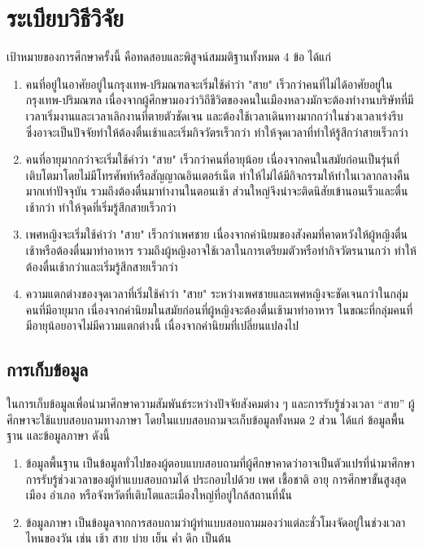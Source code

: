 \documentclass[a4paper]{article}
\begin{document}
\section{ระเบียบวิธีวิจัย}
    เป้าหมายของการศึกษาครั้งนี้ คือทดสอบและพิสูจน์สมมติฐานทั้งหมด 4 ข้อ ได้แก่
    \begin{enumerate}
        \item คนที่อยู่ในอาศัยอยู่ในกรุงเทพ-ปริมณฑลจะเริ่มใช้คำว่า "สาย" เร็วกว่าคนที่ไม่ได้อาศัยอยู่ในกรุงเทพ-ปริมณฑล เนื่องจากผู้ศึกษามองว่าวิถีชีวิตของคนในเมืองหลวงมักจะต้องทำงานบริษัทที่มีเวลาเริ่มงานและเวลาเลิกงานที่ตายตัวชัดเจน และต้องใช้เวลาเดินทางมากกว่าในช่วงเวลาเร่งรีบ ซึ่งอาจะเป็นปัจจัยทำให้ต้องตื่นเช้าและเริ่มกิจวัตรเร็วกว่า ทำให้จุดเวลาที่ทำให้รู้สึกว่าสายเร็วกว่า
        \item คนที่อายุมากกว่าจะเริ่มใช้คำว่า "สาย" เร็วกว่าคนที่อายุน้อย เนื่องจากคนในสมัยก่อนเป็นรุ่นที่เติบโตมาโดยไม่มีโทรศัพท์หรือสัญญาณอินเตอร์เน็ต ทำให้ไม่ได้มีกิจกรรมให้ทำในเวลากลางคืนมากเท่าปัจจุบัน รวมถึงต้องตื่นมาทำงานในตอนเช้า ส่วนใหญ่จึงน่าจะติดนิสัยเข้านอนเร็วและตื่นเช้ากว่า ทำให้จุดที่เริ่มรู้สึกสายเร็วกว่า
        \item เพศหญิงจะเริ่มใช้คำว่า "สาย" เร็วกว่าเพศชาย เนื่องจากค่านิยมของสังคมที่คาดหวังให้ผู้หญิงตื่นเช้าหรือต้องตื่นมาทำอาหาร รวมถึงผู้หญิงอาจใช้เวลาในการเตรียมตัวหรือทำกิจวัตรนานกว่า ทำให้ต้องตื่นเช้ากว่าและเริ่มรู้สึกสายเร็วกว่า
        \item ความแตกต่างของจุดเวลาที่เริ่มใช้คำว่า "สาย" ระหว่างเพศชายและเพศหญิงจะชัดเจนกว่าในกลุ่มคนที่มีอายุมาก เนื่องจากค่านิยมในสมัยก่อนที่ผู้หญิงจะต้องตื่นเช้ามาทำอาหาร ในขณะที่กลุ่มคนที่มีอายุน้อยอาจไม่มีความแตกต่างนี้ เนื่องจากค่านิยมที่เปลี่ยนแปลงไป
    \end{enumerate}
\subsection{การเก็บข้อมูล}
    ในการเก็บข้อมูลเพื่อนำมาศึกษาความสัมพันธ์ระหว่างปัจจัยสังคมต่าง ๆ และการรับรู้ช่วงเวลา “สาย” ผู้ศึกษาจะใช้แบบสอบถามทางภาษา โดยในแบบสอบถามจะเก็บข้อมูลทั้งหมด 2 ส่วน ได้แก่ ข้อมูลพื้นฐาน และข้อมูลภาษา ดังนี้
    \begin{enumerate}
        \item ข้อมูลพื้นฐาน เป็นข้อมูลทั่วไปของผู้ตอบแบบสอบถามที่ผู้ศึกษาคาดว่าอาจเป็นตัวแปรที่นำมาศึกษาการรับรู้ช่วงเวลาของผู้ทำแบบสอบถามได้ ประกอบไปด้วย เพศ เชื้อชาติ อายุ การศึกษาขั้นสูงสุด เมือง อำเภอ หรือจังหวัดที่เติบโตและเมืองใหญ่ที่อยู่ใกล้สถานที่นั้น
        \item ข้อมูลภาษา เป็นข้อมูลจากการสอบถามว่าผู้ทำแบบสอบถามมองว่าแต่ละชั่วโมงจัดอยู่ในช่วงเวลาไหนของวัน เช่น เช้า สาย บ่าย เย็น ค่ำ ดึก เป็นต้น
    \end{enumerate}
\end{document}
